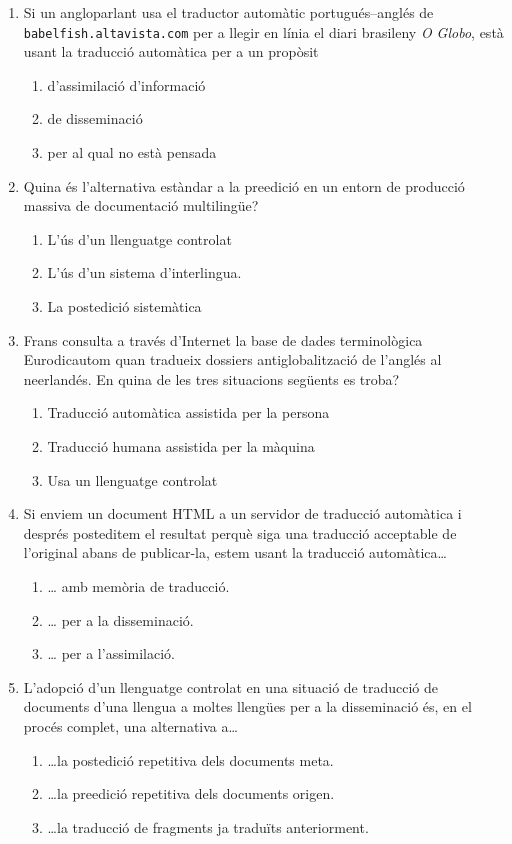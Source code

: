 \begin{enumerate}
\item Si un angloparlant usa el traductor automàtic
   portugués--anglés de \verb|babelfish.altavista.com| 
   per a llegir en línia el diari brasileny \emph{O Globo},
   està usant la traducció automàtica per a un propòsit 
   
\begin{enumerate}
\item d'assimilació d'informació
\item de disseminació
\item per al qual no està pensada
\end{enumerate}
\item Quina és l'alternativa estàndar a la preedició en un entorn
   de producció massiva de documentació multilingüe?
   
\begin{enumerate}
\item L'ús d'un llenguatge controlat
\item L'ús d'un sistema d'interlingua.
\item La postedició sistemàtica
\end{enumerate}
\item Frans consulta a través d'Internet la base de dades terminològica
   Eurodicautom quan tradueix dossiers antiglobalització de l'anglés
   al neerlandés. En quina de les tres situacions següents es troba?
   
\begin{enumerate}
\item Traducció automàtica assistida per la persona
\item Traducció humana assistida per la màquina
\item Usa un llenguatge controlat
\end{enumerate}


\item Si enviem un document HTML a un servidor de traducció automàtica
  i després posteditem el resultat perquè siga una traducció
  acceptable de l'original abans de publicar-la, estem usant la
  traducció automàtica{\ldots}
   
\begin{enumerate}
\item {\ldots} amb memòria de traducció.
\item {\ldots} per a la disseminació.
\item {\ldots} per a l'assimilació.
\end{enumerate}

\item L'adopció d'un llenguatge controlat en una situació de traducció
de documents d'una llengua a moltes llengües per a la disseminació
és, en el procés complet, una alternativa a{\ldots}
\begin{enumerate}
\item {\ldots}la postedició repetitiva dels documents meta.
\item {\ldots}la preedició repetitiva dels documents origen.
\item {\ldots}la traducció de fragments ja traduïts anteriorment.
\end{enumerate}


\end{enumerate}
